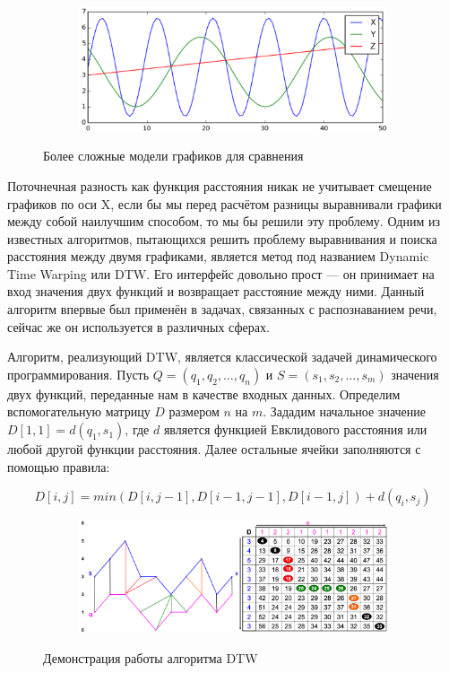 \begin{figure}[ht]
	\centering
    \begin{subfigure}[b]{1\textwidth}
    \centering
        \includegraphics[scale=0.45]{pasted-image-39.png}        
    \end{subfigure}
 
    \caption{Более сложные модели графиков для сравнения}
    \label{fig_parsetree}
\end{figure}

Поточнечная разность как функция расстояния никак не учитывает смещение графиков по оси X, если бы мы перед расчётом разницы выравнивали графики между собой наилучшим способом, то мы бы решили эту проблему.
Одним из известных алгоритмов, пытающихся решить проблему выравнивания и поиска расстояния между двумя графиками, является метод под названием Dynamic Time Warping или DTW.
Его интерфейс довольно прост — он принимает на вход значения двух функций и возвращает расстояние между ними. Данный алгоритм впервые был применён в задачах, связанных с распознаванием речи, сейчас же он используется в различных сферах.

Алгоритм, реализующий DTW, является классической задачей динамического программирования.
Пусть  $Q = \left( q_1, q_2, \dots, q_n \right)$ и $S = \left( s_1, s_2, \dots, s_m \right)$ значения двух функций, переданные нам в качестве входных данных.
Определим вспомогательную матрицу $D$ размером $n$ на $m$.
Зададим начальное значение $D[1, 1] = d(q_1, s_1)$, где $d$ является функцией Евклидового расстояния или любой другой функции расстояния.
Далее остальные ячейки заполняются с помощью правила:

$$D[i, j] = min(D[i, j - 1], D[i - 1, j - 1], D[i - 1, j]) + d(q_i, s_j)$$

\begin{figure}[ht]
	\centering
    \begin{subfigure}[b]{1\textwidth}
    \centering
        \includegraphics[scale=0.40]{pasted-image-41.png}        
    \end{subfigure}
 
    \caption{Демонстрация работы алгоритма DTW}
    \label{fig_parsetree}
\end{figure}

